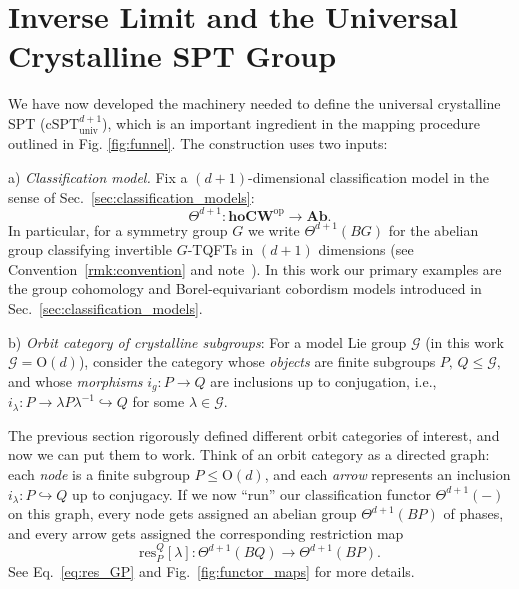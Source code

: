 \documentclass[aps,prx,reprint,superscriptaddress,twocolumn,amsmath,amssymb,amsfonts, nofootinbib]{revtex4-2}
\newcommand{\res}{\text{res}}
\theoremstyle{apsstyle}
\begin{document}
\section{Inverse Limit and the Universal Crystalline SPT Group}\label{sec:inverselimit} We have now developed the machinery needed to define the universal crystalline SPT ($\mathrm{cSPT}^{d+1}_{\mathrm{univ}}$), which is an important ingredient in the mapping procedure outlined in Fig. \ref{fig:funnel}. The construction uses two inputs:

\smallskip
\noindent a) \textit{Classification model.} 
Fix a $(d{+}1)$-dimensional classification model in the sense of Sec.~\ref{sec:classification_models}:
\begin{equation*}
\Theta^{d+1}:\mathbf{hoCW}^{\mathrm{op}}\to \mathbf{Ab}.
\end{equation*}
In particular, for a symmetry group $G$ we write $\Theta^{d+1}(BG)$ for the abelian group classifying invertible $G$-TQFTs in $(d{+}1)$ dimensions (see Convention~\ref{rmk:convention} and note~\cite{note_functor}). In this work our primary examples are the group cohomology and Borel-equivariant cobordism models introduced in Sec.~\ref{sec:classification_models}.

\bigskip

\noindent b) \textit{Orbit category of crystalline subgroups}: 
For a model Lie group $\mathcal{G}$ (in this work $\mathcal{G}=\mathrm{O}(d)$), consider the category whose \emph{objects} are finite subgroups $P,\, Q\le \mathcal{G},$ and whose \emph{morphisms} $i_{g}:P\to Q$ are inclusions up to conjugation, i.e., $i_{\lambda}:P\to \lambda P \lambda^{-1}\hookrightarrow Q$ for some $\lambda \in \mathcal{G}$. 

\bigskip 

The previous section rigorously defined different orbit categories of interest, and now we can put them to work. Think of an orbit category as a directed graph: each \emph{node} is a finite subgroup $P \leq \mathrm{O}(d)$, and each \emph{arrow} represents an inclusion $i_{\lambda }:P \hookrightarrow Q$ up to conjugacy. If we now ``run'' our classification functor $\Theta^{d+1}(-)$ on this graph,  
every node gets assigned an abelian group $\Theta^{d+1}(BP)$ of phases, and every arrow gets assigned the corresponding restriction map  
\begin{equation*}
\res^{Q}_{P}[\lambda ] \colon \Theta^{d+1}(BQ) \longrightarrow \Theta^{d+1}(BP).
\end{equation*} 
See Eq.~\ref{eq:res_GP} and Fig.~\ref{fig:functor_maps} for more details. 
\end{document}
